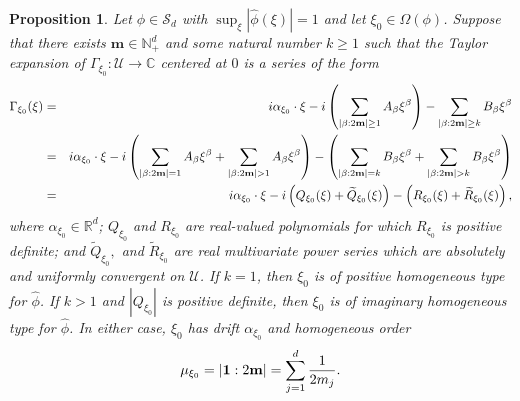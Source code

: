 \documentclass[11pt, letter]{book}
\newtheorem{proposition}[theorem]{Proposition}
\newcommand{\lp}{\left(}
\newcommand{\rp}{\right)}
\newcommand{\al}{\alpha}
\newcommand{\be}{\beta}
\begin{document}
\begin{framed}
\begin{proposition}\label{prop:ExpandGamma}
Let $\phi\in\mathcal{S}_d$ with $\sup_{\xi}|\widehat{\phi}(\xi)|=1$ and let $\xi_0\in\Omega(\phi)$. Suppose that there exists $\mathbf{m}\in \mathbb{N}^d_+$ and some natural number $k \geq 1$ such that the Taylor expansion of $\Gamma_{\xi_0} : \mathcal{U}\to\mathbb{C}$ centered at $0$ is a series of the form
\begin{eqnarray}\label{eq:SemiEllipticImaginaryExpansion}\nonumber
    \Gamma_{\xi_0}(\xi) 
    &=& i\al_{\xi_0} \cdot \xi - i \left( \sum_{\abs{\be : 2\mathbf{m}} \geq 1} A_\be \xi^\be\right) - \sum_{\abs{\be : 2\mathbf{m}} \geq k} B_\be \xi^\be \\ \nonumber
    &=& i\al_{\xi_0} \cdot \xi - i \lp \sum_{\abs{\be : 2\mathbf{m}} = 1} A_\be \xi^\be + \sum_{\abs{\be : 2\mathbf{m}} > 1} A_\be \xi^\be\rp 
    - \lp \sum_{\abs{\be : 2\mathbf{m}} = k} B_\be \xi^\be + \sum_{\abs{\be : 2\mathbf{m}} > k} B_\be \xi^\be \rp \\
    &=&  i\al_{\xi_0} \cdot \xi - i\lp Q_{\xi_0}(\xi) + \widetilde{Q}_{\xi_0}(\xi)\rp - \lp R_{\xi_0}(\xi) + \widetilde{R}_{\xi_0}(\xi) \rp,
\end{eqnarray}
where $\al_{\xi_0} \in \mathbb{R}^d$;   $Q_{\xi_0}$ and $R_{\xi_0}$ are real-valued polynomials for which $R_{\xi_0}$ is positive definite; and  $\widetilde{Q}_{\xi_0},$ and $\widetilde{R}_{\xi_0}$ are real multivariate power series which are absolutely and uniformly convergent on $\mathcal{U}$. If $k=1$, then $\xi_0$ is of positive homogeneous type for $\widehat{\phi}$. If $k>1$ and $|Q_{\xi_0}|$ is positive definite, then $\xi_0$ is of imaginary homogeneous type for $\hat{\phi}$. In either case, $\xi_0$ has drift $\alpha_{\xi_0}$ and homogeneous order
\begin{equation*}
    \mu_{\xi_0}=\abs{\mathbf{1}:2\mathbf{m}}=\sum_{j=1}^d\frac{1}{2m_j}.
\end{equation*}
\end{proposition}
\end{framed}
\end{document}
